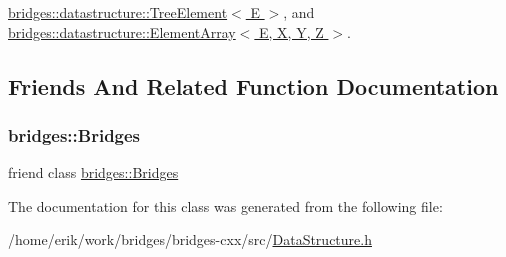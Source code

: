 \hyperlink{classbridges_1_1datastructure_1_1_tree_element_a897f34ea284da45e1dc869c3e3b6c9a4}{bridges\+::datastructure\+::\+Tree\+Element$<$ E $>$}, and \hyperlink{classbridges_1_1datastructure_1_1_element_array_a22d8c37e88616105cdb7c755f99fdb20}{bridges\+::datastructure\+::\+Element\+Array$<$ E, X, Y, Z $>$}.



\subsection{Friends And Related Function Documentation}
\mbox{\label{classbridges_1_1datastructure_1_1_data_structure_a5c4164a6c5cd1eab3f12871efc2dbe26}} 
\subsubsection{\texorpdfstring{bridges\+::\+Bridges}{bridges::Bridges}}
{\footnotesize\ttfamily friend class \hyperlink{classbridges_1_1_bridges}{bridges\+::\+Bridges}\hspace{0.3cm}{\ttfamily [friend]}}



The documentation for this class was generated from the following file\+:\begin{DoxyCompactItemize}
\item 
/home/erik/work/bridges/bridges-\/cxx/src/\hyperlink{_data_structure_8h}{Data\+Structure.\+h}\end{DoxyCompactItemize}
